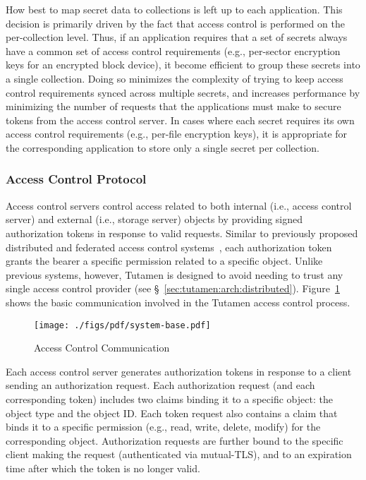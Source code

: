 How best to map secret data to collections is left up to each
application. This decision is primarily driven by the fact that access
control is performed on the per-collection level. Thus, if an
application requires that a set of secrets always have a common set of
access control requirements (e.g., per-sector encryption keys for an
encrypted block device), it become efficient to group these secrets
into a single collection. Doing so minimizes the complexity of trying
to keep access control requirements synced across multiple secrets,
and increases performance by minimizing the number of requests that
the applications must make to secure tokens from the access control
server. In cases where each secret requires its own access control
requirements (e.g., per-file encryption keys), it is appropriate for
the corresponding application to store only a single secret per
collection.

\subsubsection{Access Control Protocol}
\label{sec:tutamen:arch:acp}

Access control servers control access related to both internal
(i.e., access control server) and external (i.e., storage server)
objects by providing signed authorization tokens in response to valid
requests. Similar to previously proposed distributed and federated
access control systems~\cite{Calero2010, Leandro2012},
each authorization token grants the bearer a specific permission
related to a specific object. Unlike previous systems, however,
Tutamen is designed to avoid needing to trust any single access
control provider (see \S~\ref{sec:tutamen:arch:distributed}).
Figure~\ref{fig:tutamen:systembase} shows the basic communication
involved in the Tutamen access control process.

\begin{figure}[th]
  \centering
  \texttt{[image: ./figs/pdf/system-base.pdf]}
  \caption{Access Control Communication}
  \label{fig:tutamen:systembase}
\end{figure}

Each access control server generates authorization tokens in response
to a client sending an authorization request. Each authorization
request (and each corresponding token) includes two claims binding it
to a specific object: the object type and the object ID. Each token
request also contains a claim that binds it to a specific permission
(e.g., read, write, delete, modify) for the corresponding
object. Authorization requests are further bound to the specific
client making the request (authenticated via mutual-TLS), and to an
expiration time after which the token is no longer valid.


